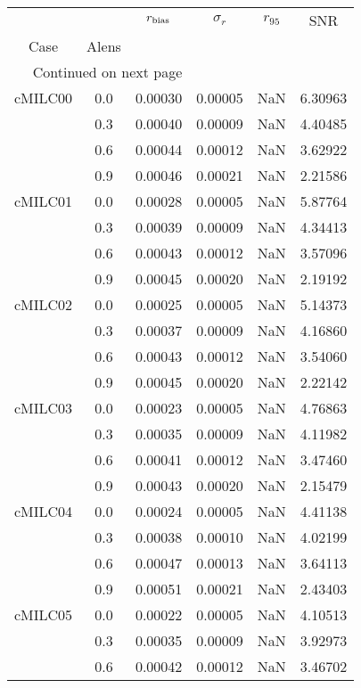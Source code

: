 \begin{longtable}{cccccc}
\toprule
        &     &  $r_{\rm bias}$  &  $\sigma_r$ &  $r_{95}$ &     SNR \\
Case & Alens &                  &             &           &         \\
\midrule
\endhead
\midrule
\multicolumn{3}{r}{{Continued on next page}} \\
\midrule
\endfoot

\bottomrule
\endlastfoot
cMILC00 & 0.0 & 0.00030 & 0.00005 & NaN & 6.30963 \\
        & 0.3 & 0.00040 & 0.00009 & NaN & 4.40485 \\
        & 0.6 & 0.00044 & 0.00012 & NaN & 3.62922 \\
        & 0.9 & 0.00046 & 0.00021 & NaN & 2.21586 \\
cMILC01 & 0.0 & 0.00028 & 0.00005 & NaN & 5.87764 \\
        & 0.3 & 0.00039 & 0.00009 & NaN & 4.34413 \\
        & 0.6 & 0.00043 & 0.00012 & NaN & 3.57096 \\
        & 0.9 & 0.00045 & 0.00020 & NaN & 2.19192 \\
cMILC02 & 0.0 & 0.00025 & 0.00005 & NaN & 5.14373 \\
        & 0.3 & 0.00037 & 0.00009 & NaN & 4.16860 \\
        & 0.6 & 0.00043 & 0.00012 & NaN & 3.54060 \\
        & 0.9 & 0.00045 & 0.00020 & NaN & 2.22142 \\
cMILC03 & 0.0 & 0.00023 & 0.00005 & NaN & 4.76863 \\
        & 0.3 & 0.00035 & 0.00009 & NaN & 4.11982 \\
        & 0.6 & 0.00041 & 0.00012 & NaN & 3.47460 \\
        & 0.9 & 0.00043 & 0.00020 & NaN & 2.15479 \\
cMILC04 & 0.0 & 0.00024 & 0.00005 & NaN & 4.41138 \\
        & 0.3 & 0.00038 & 0.00010 & NaN & 4.02199 \\
        & 0.6 & 0.00047 & 0.00013 & NaN & 3.64113 \\
        & 0.9 & 0.00051 & 0.00021 & NaN & 2.43403 \\
cMILC05 & 0.0 & 0.00022 & 0.00005 & NaN & 4.10513 \\
        & 0.3 & 0.00035 & 0.00009 & NaN & 3.92973 \\
        & 0.6 & 0.00042 & 0.00012 & NaN & 3.46702 \\

\end{longtable}
